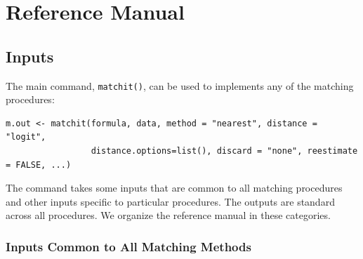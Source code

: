 \documentclass[oneside,letterpaper,titlepage]{article}
\begin{document}



\section{Reference Manual}
\label{sec:reference}

\subsection{Inputs}

The main command, \texttt{matchit()}, can be used to implements any of
the matching procedures:
\begin{verbatim}
m.out <- matchit(formula, data, method = "nearest", distance = "logit",
                 distance.options=list(), discard = "none", reestimate = FALSE, ...)
\end{verbatim}
The command takes some inputs that are common to all matching
procedures and other inputs specific to particular procedures.  The
outputs are standard across all procedures.  We organize the reference
manual in these categories.

\subsubsection{Inputs Common to All Matching Methods}
\end{document}
